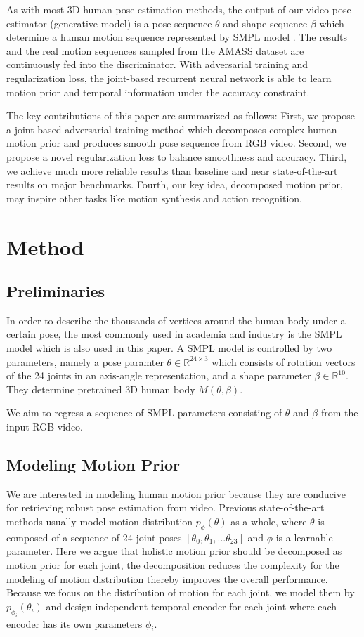 \documentclass{svproc}
\begin{document}
As with most 3D human pose estimation methods, the output of our video pose estimator (generative model) is a pose sequence $\theta$ and shape sequence $\beta$ which determine a human motion sequence represented by SMPL model \cite{loper2015smpl}. The results and the real motion sequences sampled from the AMASS dataset \cite{mahmood2019amass} are continuously fed into the discriminator. With adversarial training and regularization loss, the joint-based recurrent neural network is able to learn motion prior and temporal information under the accuracy constraint.

The key contributions of this paper are summarized as follows: First, we propose a joint-based adversarial training method which decomposes complex human motion prior and produces smooth pose sequence from RGB video. Second, we propose a novel regularization loss to balance smoothness and accuracy. Third, we achieve much more reliable results than baseline and near state-of-the-art results on major benchmarks. Fourth, our key idea, decomposed motion prior, may inspire other tasks like motion synthesis and action recognition.


\section{Method}
\subsection{Preliminaries}
In order to describe the thousands of vertices around the human body under a certain pose, the most commonly used in academia and industry is the SMPL model which is also used in this paper. A SMPL model is controlled by two parameters, namely a pose paramter $\theta \in \mathbb{R}^{24 \times 3}$ which consists of rotation vectors of the 24 joints in an axis-angle representation, and a shape parameter $\beta \in \mathbb{R}^{10}$. They determine pretrained 3D human body $M(\theta, \beta)$. 

We aim to regress a sequence of SMPL parameters consisting of $\theta$ and $\beta$ from the input RGB video. 

\subsection{Modeling Motion Prior}
We are interested in modeling human motion prior because they are conducive for retrieving robust pose estimation from video. Previous state-of-the-art methods usually model motion distribution $p_{\phi}(\theta)$ as a whole, where $\theta$ is composed of a sequence of 24 joint poses $\left[\theta_{0}, \theta_{1},... \theta_{23} \right]$ and $\phi$ is a learnable parameter. Here we argue that holistic motion prior should be decomposed as motion prior for each joint, the decomposition reduces the complexity for the modeling of motion distribution thereby improves the overall performance. Because we focus on the distribution of motion for each joint, we model them by $p_{\phi_i}(\theta_i)$ and design independent temporal encoder for each joint where each encoder has its own parameters $\phi_i$.
\end{document}
